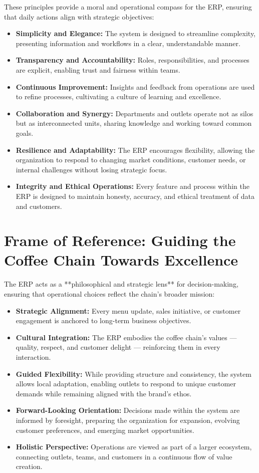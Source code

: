 These principles provide a moral and operational compass for the ERP, ensuring that daily actions align with strategic objectives:

\begin{itemize}
    \item \textbf{Simplicity and Elegance:} The system is designed to streamline complexity, presenting information and workflows in a clear, understandable manner.  
    \item \textbf{Transparency and Accountability:} Roles, responsibilities, and processes are explicit, enabling trust and fairness within teams.  
    \item \textbf{Continuous Improvement:} Insights and feedback from operations are used to refine processes, cultivating a culture of learning and excellence.  
    \item \textbf{Collaboration and Synergy:} Departments and outlets operate not as silos but as interconnected units, sharing knowledge and working toward common goals.  
    \item \textbf{Resilience and Adaptability:} The ERP encourages flexibility, allowing the organization to respond to changing market conditions, customer needs, or internal challenges without losing strategic focus.  
    \item \textbf{Integrity and Ethical Operations:} Every feature and process within the ERP is designed to maintain honesty, accuracy, and ethical treatment of data and customers.  
\end{itemize}

\section{Frame of Reference: Guiding the Coffee Chain Towards Excellence}

The ERP acts as a **philosophical and strategic lens** for decision-making, ensuring that operational choices reflect the chain’s broader mission:

\begin{itemize}
    \item \textbf{Strategic Alignment:} Every menu update, sales initiative, or customer engagement is anchored to long-term business objectives.  
    \item \textbf{Cultural Integration:} The ERP embodies the coffee chain’s values — quality, respect, and customer delight — reinforcing them in every interaction.  
    \item \textbf{Guided Flexibility:} While providing structure and consistency, the system allows local adaptation, enabling outlets to respond to unique customer demands while remaining aligned with the brand’s ethos.  
    \item \textbf{Forward-Looking Orientation:} Decisions made within the system are informed by foresight, preparing the organization for expansion, evolving customer preferences, and emerging market opportunities.  
    \item \textbf{Holistic Perspective:} Operations are viewed as part of a larger ecosystem, connecting outlets, teams, and customers in a continuous flow of value creation.  
\end{itemize}

